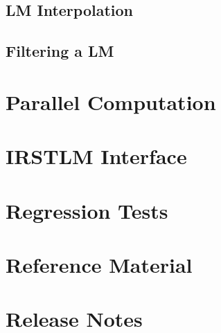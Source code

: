 \documentclass[11pt]{article}
\begin{document}
\newpage
\subsection{LM Interpolation}
\label{sec:LMInterpolation}


\newpage
\subsection{Filtering a LM}
\label{sec:LMFiltering}


\newpage
\section{Parallel Computation}
\label{sec:ParallelComputation}


\newpage
\section{IRSTLM Interface}
\label{sec:LMinterface}


\newpage
\section{Regression Tests}
\label{sec:regressionTests}


\appendix


\newpage
\section{Reference Material}
\label{sec:ReferenceMaterial}


\newpage
\section{Release Notes}
\label{sec:releaseNotes}

\end{document}
